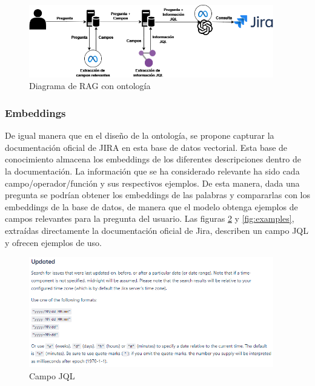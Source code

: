 \begin{figure}[H]
    \centering
    \includegraphics[width=0.95\textwidth]{images/rag_ontologia.png}
    \caption{Diagrama de RAG con ontología}\label{fig:ontologia}
\end{figure}


\subsubsection{Embeddings}
De igual manera que en el diseño de la ontología, se propone capturar la documentación oficial de JIRA en esta base de datos vectorial. Esta base de conocimiento almacena los embeddings de los diferentes descripciones dentro de la documentación. La información que se ha considerado relevante ha sido cada campo/operador/función y sus respectivos ejemplos. De esta manera, dada una pregunta se podrían obtener los embeddings de las palabras y compararlas con los embeddings de la base de datos, de manera que el modelo obtenga ejemplos de campos relevantes para la pregunta del usuario. Las figuras \ref{fig:field} y \ref{fig:examples}, extraídas directamente la documentación oficial de Jira, describen un campo JQL y ofrecen ejemplos de uso.
\begin{figure}[H]
    \centering
    \includegraphics[width=0.95\textwidth]{images/JQL_docs_updated1.png}
    \caption{Campo JQL}\label{fig:field}
\end{figure}
